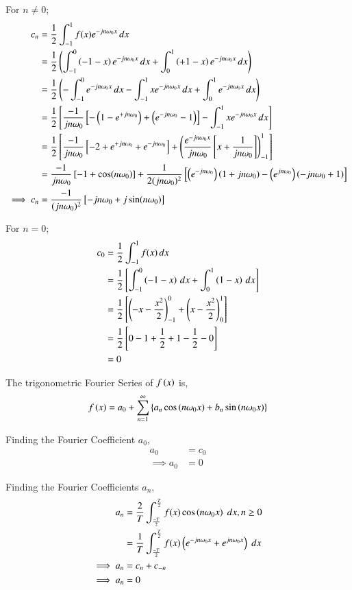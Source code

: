 \documentclass[journal,12pt,onecolumn]{IEEEtran}
\theoremstyle{remark}
\begin{document}
For $n\neq 0$;
\begin{align}
c_{n} &= \frac{1}{2} \int_{-1}^{1} f(x) e^{-jn\omega_{0}x} \, dx \\
&= \frac{1}{2} \left( \int_{-1}^{0}\left(-1-x\right)e^{-jn\omega_{0}x} \, dx +  \int_{0}^{1}\left(+1-x\right)e^{-jn\omega_{0}x} \, dx \right) \\
&= \frac{1}{2} \left(-\int_{-1}^{0}e^{-jn\omega_{0}x} \, dx-\int_{-1}^{1}xe^{-jn\omega_{0}x} \, dx + \int_{0}^{1}e^{-jn\omega_{0}x} \, dx\right) \\
&= \frac{1}{2} {}\left[\frac{-1}{jn\omega_{0}}{}\left[-\left(1 - e^{+jn\omega_{0}}\right) + \left(e^{-jn\omega_{0}} -1\right)\right] -\int_{-1}^{1}xe^{-jn\omega_{0}x} \, dx\right] \\
&= \frac{1}{2} {}\left[\frac{-1}{jn\omega_{0}}{}\left[-2 +e^{+jn\omega_{0}} + e^{-jn\omega_{0}}\right] +\left(\frac{e^{-jn\omega_{0}x}}{jn\omega_{0}}{}\left[x + \frac{1}{jn\omega_{0}}\right]\right)_{-1}^{1}\right] \\
&= \frac{-1}{jn\omega_{0}}{}\left[-1 + \cos(n\omega_{0})\right] + \frac{1}{2(jn\omega_{0})^2}{}\left[\left(e^{-jn\omega_{0}}  \right)\left(1+jn\omega_{0}\right)- \left(e^{jn\omega_{0}} \right)\left(-jn\omega_{0}+1\right)\right] \\
\implies c_{n}&= \frac{-1}{(jn\omega_{0})^2}{}\left[-jn\omega_{0} + j \sin(n\omega_{0})\right]
\end{align} 

For $n=0$;
\begin{align}
c_{0} &= \frac{1}{2} \int_{-1}^{1} f(x) \, dx \\
&=  \frac{1}{2} {}\left[\int_{-1}^{0} \left(-1-x\right) \, dx + \int_{0}^{1} \left(1-x\right) \, dx \right] \\
&= \frac{1}{2} {}\left[ \left(-x-\frac{x^2}{2}\right)_{-1}^{0} + \left(x-\frac{x^2}{2}\right)_{0}^{1}\right] \\
&= \frac{1}{2} {}\left[0-1+\frac{1}{2} +1 -\frac{1}{2} -0\right] \\
&= 0
\end{align}


The trigonometric Fourier Series of $f\left(x\right)$ is,
\begin{align}
    f\left(x\right)=a_0+\sum_{n=1}^{\infty}\left\{a_n\cos\left(n\omega_{0}x\right)+b_n\sin\left(n\omega_{0}x\right)\right\}
\end{align}

Finding the Fourier Coefficient $a_0$,
\begin{align}
    a_0&=c_0\\
    \implies a_0&= 0
\end{align}

Finding the Fourier Coefficients $a_n$,
\begin{align}
    a_n&=\frac{2}{T}\int_{\frac{-T}{2}}^{\frac{T}{2}}f(x)\cos\left(n\omega_{0}x\right)\;dx, n \geq 0 \\
    &= \frac{1}{T}\int_{\frac{-T}{2}}^{\frac{T}{2}}f(x)\left(e^{-jn\omega_{0}x}+e^{jn\omega_{0}x}\right) \; dx \\
 \implies a_n   &= c_{n} + c_{-n} \\
 \implies a_n&= 0 \\
\end{align}  
  
\end{document}
